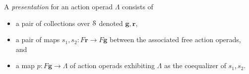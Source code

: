 \begin{Defi}
  A \textit{presentation} for an action operad $\Lambda$ consists of
  \begin{itemize}
    \item a pair of collections over $\mathcal{S}$ denoted $\mathbf{g}, \mathbf{r}$,
    \item a pair of maps $s_{1}, s_{2} \colon F\mathbf{r} \rightarrow F\mathbf{g}$ between the associated free action operads, and
    \item a map $p \colon F\mathbf{g} \rightarrow \Lambda$ of action operads exhibiting $\Lambda$ as the coequalizer of $s_{1},s_{2}$.
  \end{itemize}
\end{Defi}







